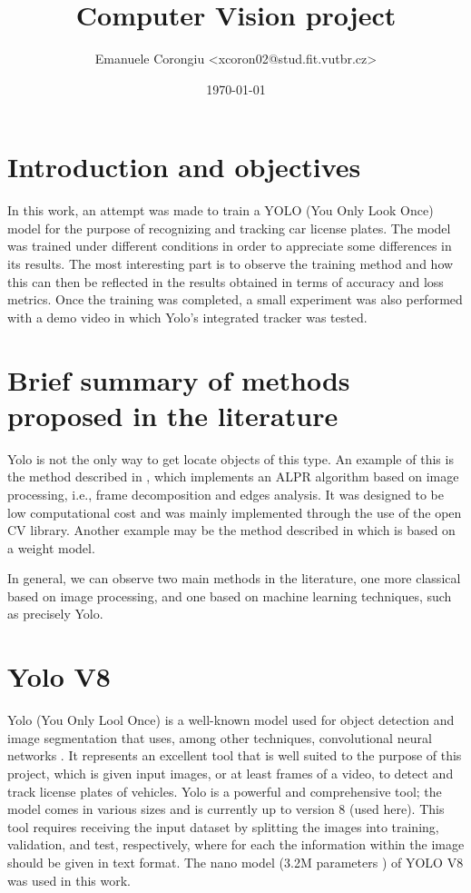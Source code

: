 \documentclass[12pt]{article}
\title{\textbf{Computer Vision project}}
\author{Emanuele Corongiu <xcoron02@stud.fit.vutbr.cz>}
\date{\today}
\begin{document}


\section{Introduction and objectives}
In this work, an attempt was made to train a YOLO (You Only Look Once) model for the purpose of recognizing and tracking car license plates. The model was trained under different conditions in order to appreciate some differences in its results. The most interesting part is to observe the training method and how this can then be reflected in the results obtained in terms of accuracy and loss metrics. Once the training was completed, a small experiment was also performed with a demo video in which Yolo's integrated tracker was tested.



\section{Brief summary of methods proposed in the literature}
Yolo is not the only way to get locate objects of this type. An example of this is the method described in \cite{9790745}, which implements an ALPR algorithm based on image processing, i.e., frame decomposition and edges analysis. It was designed to be low computational cost and was mainly implemented through the use of the open CV library. Another example may be the method described in \cite{9755690} which is based on a weight model.

In general, we can observe two main methods \cite{9755690} in the literature, one more classical based on image processing, and one based on machine learning techniques, such as precisely Yolo.
\clearpage

\section{Yolo V8}
Yolo (You Only Lool Once) \cite{yolo1} is a well-known model used for object detection and image segmentation that uses, among other techniques, convolutional neural networks \cite{CV_course_slide}. It represents an excellent tool that is well suited to the purpose of this project, which is given input images, or at least frames of a video, to detect and track license plates of vehicles. Yolo is a powerful and comprehensive tool; the model comes in various sizes and is currently up to version 8 (used here). This tool requires receiving the input dataset by splitting the images into training, validation, and test, respectively, where for each the information within the image should be given in text format. The nano model (3.2M parameters \cite{yolo1}) of YOLO V8 was used in this work.
\end{document}
